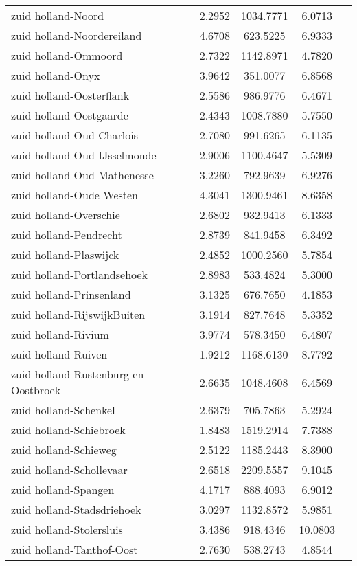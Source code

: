 \begin{longtable}{llccc}
zuid holland-Noord & 2.2952 & 1034.7771 & 6.0713 \\
zuid holland-Noordereiland & 4.6708 & 623.5225 & 6.9333 \\
zuid holland-Ommoord & 2.7322 & 1142.8971 & 4.7820 \\
zuid holland-Onyx & 3.9642 & 351.0077 & 6.8568 \\
zuid holland-Oosterflank & 2.5586 & 986.9776 & 6.4671 \\
zuid holland-Oostgaarde & 2.4343 & 1008.7880 & 5.7550 \\
zuid holland-Oud-Charlois & 2.7080 & 991.6265 & 6.1135 \\
zuid holland-Oud-IJsselmonde & 2.9006 & 1100.4647 & 5.5309 \\
zuid holland-Oud-Mathenesse & 3.2260 & 792.9639 & 6.9276 \\
zuid holland-Oude Westen & 4.3041 & 1300.9461 & 8.6358 \\
zuid holland-Overschie & 2.6802 & 932.9413 & 6.1333 \\
zuid holland-Pendrecht & 2.8739 & 841.9458 & 6.3492 \\
zuid holland-Plaswijck & 2.4852 & 1000.2560 & 5.7854 \\
zuid holland-Portlandsehoek & 2.8983 & 533.4824 & 5.3000 \\
zuid holland-Prinsenland & 3.1325 & 676.7650 & 4.1853 \\
zuid holland-RijswijkBuiten & 3.1914 & 827.7648 & 5.3352 \\
zuid holland-Rivium & 3.9774 & 578.3450 & 6.4807 \\
zuid holland-Ruiven & 1.9212 & 1168.6130 & 8.7792 \\
zuid holland-Rustenburg en Oostbroek & 2.6635 & 1048.4608 & 6.4569 \\
zuid holland-Schenkel & 2.6379 & 705.7863 & 5.2924 \\
zuid holland-Schiebroek & 1.8483 & 1519.2914 & 7.7388 \\
zuid holland-Schieweg & 2.5122 & 1185.2443 & 8.3900 \\
zuid holland-Schollevaar & 2.6518 & 2209.5557 & 9.1045 \\
zuid holland-Spangen & 4.1717 & 888.4093 & 6.9012 \\
zuid holland-Stadsdriehoek & 3.0297 & 1132.8572 & 5.9851 \\
zuid holland-Stolersluis & 3.4386 & 918.4346 & 10.0803 \\
zuid holland-Tanthof-Oost & 2.7630 & 538.2743 & 4.8544 \\

\end{longtable}
